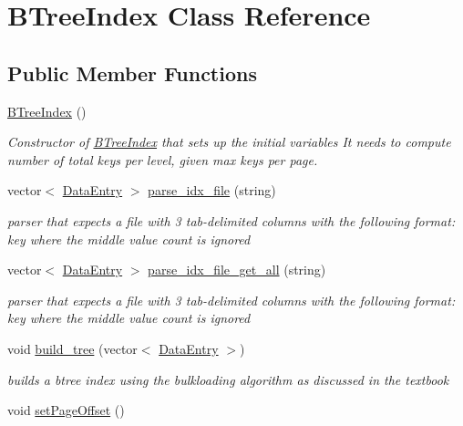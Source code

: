 \hypertarget{class_b_tree_index}{}\section{B\+Tree\+Index Class Reference}
\label{class_b_tree_index}
\subsection*{Public Member Functions}
\begin{DoxyCompactItemize}
\item 
\hyperlink{class_b_tree_index_ae737b5dea98c2e2036fd3b3d9bdcfc22}{B\+Tree\+Index} ()
\begin{DoxyCompactList}\small\item\em Constructor of \hyperlink{class_b_tree_index}{B\+Tree\+Index} that sets up the initial variables It needs to compute number of total keys per level, given max keys per page. \end{DoxyCompactList}\item 
\hypertarget{class_b_tree_index_a6202c61a8541b0f5c13eef1f1a940e31}{}vector$<$ \hyperlink{class_data_entry}{Data\+Entry} $>$ \hyperlink{class_b_tree_index_a6202c61a8541b0f5c13eef1f1a940e31}{parse\+\_\+idx\+\_\+file} (string)\label{class_b_tree_index_a6202c61a8541b0f5c13eef1f1a940e31}

\begin{DoxyCompactList}\small\item\em parser that expects a file with 3 tab-\/delimited columns with the following format\+: key where the middle value count is ignored \end{DoxyCompactList}\item 
\hypertarget{class_b_tree_index_a4a7270c48f911f355442265f1dc340fd}{}vector$<$ \hyperlink{class_data_entry}{Data\+Entry} $>$ \hyperlink{class_b_tree_index_a4a7270c48f911f355442265f1dc340fd}{parse\+\_\+idx\+\_\+file\+\_\+get\+\_\+all} (string)\label{class_b_tree_index_a4a7270c48f911f355442265f1dc340fd}

\begin{DoxyCompactList}\small\item\em parser that expects a file with 3 tab-\/delimited columns with the following format\+: key where the middle value count is ignored \end{DoxyCompactList}\item 
void \hyperlink{class_b_tree_index_a4517e016a4f60cd2e61471f6ba10f347}{build\+\_\+tree} (vector$<$ \hyperlink{class_data_entry}{Data\+Entry} $>$)
\begin{DoxyCompactList}\small\item\em builds a btree index using the bulkloading algorithm as discussed in the textbook \end{DoxyCompactList}\item 
\hypertarget{class_b_tree_index_a46927719822348be775e2ce581a06de0}{}void \hyperlink{class_b_tree_index_a46927719822348be775e2ce581a06de0}{set\+Page\+Offset} ()\label{class_b_tree_index_a46927719822348be775e2ce581a06de0}


\end{DoxyCompactItemize}
